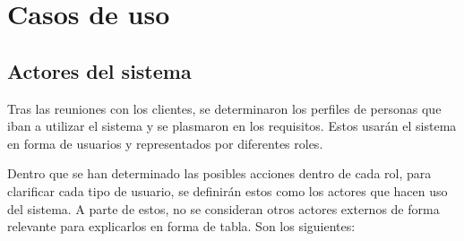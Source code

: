 \section{Casos de uso}

\subsection{Actores del sistema}

Tras las reuniones con los clientes, se determinaron los perfiles de personas que iban a utilizar el sistema y se plasmaron en los requisitos. Estos usarán el sistema en forma de usuarios y representados por diferentes roles.

Dentro que se han determinado las posibles acciones dentro de cada rol, para clarificar cada tipo de usuario, se definirán estos como los actores que hacen uso del sistema. A parte de estos, no se consideran otros actores externos de forma relevante para explicarlos en forma de tabla. Son los siguientes: 

